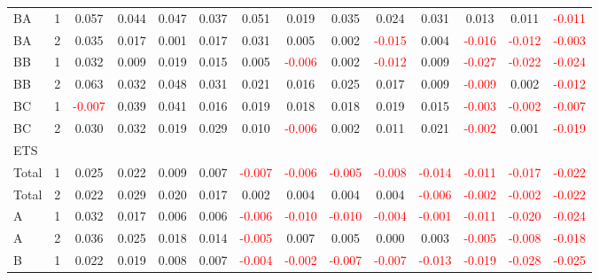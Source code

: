 \begin{table}[H]
{\begin{tabular}{llcccccccccccc}
BA & 1 & 0.057 & 0.044 & 0.047 & 0.037 & 0.051 & 0.019 & 0.035 & 0.024 & 0.031 & 0.013 & 0.011 & \textcolor{red}{-0.011}\\
BA & 2 & 0.035 & 0.017 & 0.001 & 0.017 & 0.031 & 0.005 & 0.002 & \textcolor{red}{-0.015} & 0.004 & \textcolor{red}{-0.016} & \textcolor{red}{-0.012} & \textcolor{red}{-0.003}\\
BB & 1 & 0.032 & 0.009 & 0.019 & 0.015 & 0.005 & \textcolor{red}{-0.006} & 0.002 & \textcolor{red}{-0.012} & 0.009 & \textcolor{red}{-0.027} & \textcolor{red}{-0.022} & \textcolor{red}{-0.024}\\
BB & 2 & 0.063 & 0.032 & 0.048 & 0.031 & 0.021 & 0.016 & 0.025 & 0.017 & 0.009 & \textcolor{red}{-0.009} & 0.002 & \textcolor{red}{-0.012}\\
BC & 1 & \textcolor{red}{-0.007} & 0.039 & 0.041 & 0.016 & 0.019 & 0.018 & 0.018 & 0.019 & 0.015 & \textcolor{red}{-0.003} & \textcolor{red}{-0.002} & \textcolor{red}{-0.007}\\
BC & 2 & 0.030 & 0.032 & 0.019 & 0.029 & 0.010 & \textcolor{red}{-0.006} & 0.002 & 0.011 & 0.021 & \textcolor{red}{-0.002} & 0.001 & \textcolor{red}{-0.019}\\
\hline
ETS &  &  &  &  &  &  &  &  &  &  &  &  & \\
\hline
Total & 1 & 0.025 & 0.022 & 0.009 & 0.007 & \textcolor{red}{-0.007} & \textcolor{red}{-0.006} & \textcolor{red}{-0.005} & \textcolor{red}{-0.008} & \textcolor{red}{-0.014} & \textcolor{red}{-0.011} & \textcolor{red}{-0.017} & \textcolor{red}{-0.022}\\
Total & 2 & 0.022 & 0.029 & 0.020 & 0.017 & 0.002 & 0.004 & 0.004 & 0.004 & \textcolor{red}{-0.006} & \textcolor{red}{-0.002} & \textcolor{red}{-0.002} & \textcolor{red}{-0.022}\\
A & 1 & 0.032 & 0.017 & 0.006 & 0.006 & \textcolor{red}{-0.006} & \textcolor{red}{-0.010} & \textcolor{red}{-0.010} & \textcolor{red}{-0.004} & \textcolor{red}{-0.001} & \textcolor{red}{-0.011} & \textcolor{red}{-0.020} & \textcolor{red}{-0.024}\\
A & 2 & 0.036 & 0.025 & 0.018 & 0.014 & \textcolor{red}{-0.005} & 0.007 & 0.005 & 0.000 & 0.003 & \textcolor{red}{-0.005} & \textcolor{red}{-0.008} & \textcolor{red}{-0.018}\\
B & 1 & 0.022 & 0.019 & 0.008 & 0.007 & \textcolor{red}{-0.004} & \textcolor{red}{-0.002} & \textcolor{red}{-0.007} & \textcolor{red}{-0.007} & \textcolor{red}{-0.013} & \textcolor{red}{-0.019} & \textcolor{red}{-0.028} & \textcolor{red}{-0.025}\\

\end{tabular}}
\end{table}
